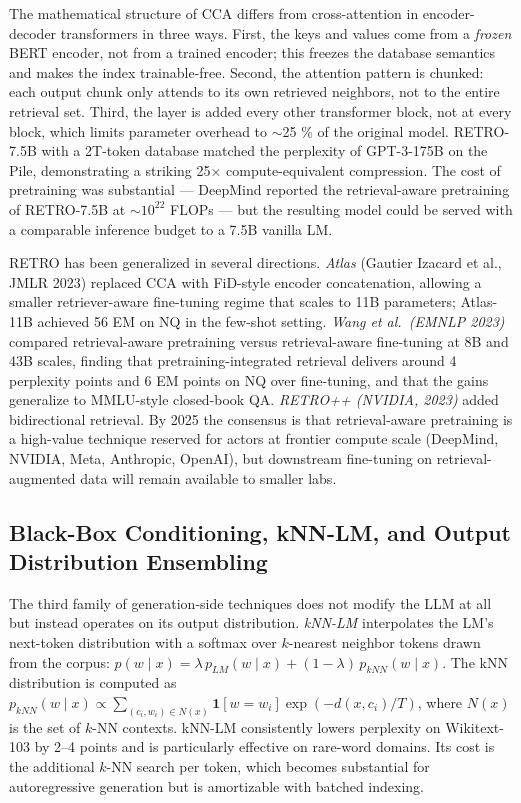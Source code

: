 \documentclass{article}
\begin{document}
The mathematical structure of CCA differs from cross-attention in encoder-decoder transformers in three ways. First, the keys and values come from a \emph{frozen} BERT encoder, not from a trained encoder; this freezes the database semantics and makes the index trainable-free. Second, the attention pattern is chunked: each output chunk only attends to its own retrieved neighbors, not to the entire retrieval set. Third, the layer is added every other transformer block, not at every block, which limits parameter overhead to $\sim$25 \% of the original model. RETRO-7.5B with a 2T-token database matched the perplexity of GPT-3-175B on the Pile, demonstrating a striking 25× compute-equivalent compression. The cost of pretraining was substantial --- DeepMind reported the retrieval-aware pretraining of RETRO-7.5B at \(\sim 10^{22}\) FLOPs --- but the resulting model could be served with a comparable inference budget to a 7.5B vanilla LM.

RETRO has been generalized in several directions. \emph{Atlas} (Gautier Izacard et al., JMLR 2023) replaced CCA with FiD-style encoder concatenation, allowing a smaller retriever-aware fine-tuning regime that scales to 11B parameters; Atlas-11B achieved 56 EM on NQ in the few-shot setting. \emph{Wang et al.~(EMNLP 2023)} compared retrieval-aware pretraining versus retrieval-aware fine-tuning at 8B and 43B scales, finding that pretraining-integrated retrieval delivers around 4 perplexity points and 6 EM points on NQ over fine-tuning, and that the gains generalize to MMLU-style closed-book QA. \emph{RETRO++ (NVIDIA, 2023)} added bidirectional retrieval. By 2025 the consensus is that retrieval-aware pretraining is a high-value technique reserved for actors at frontier compute scale (DeepMind, NVIDIA, Meta, Anthropic, OpenAI), but downstream fine-tuning on retrieval-augmented data will remain available to smaller labs.

\subsection{Black-Box Conditioning, kNN-LM, and Output Distribution Ensembling}\label{black-box-conditioning-knn-lm-and-output-distribution-ensembling}

The third family of generation-side techniques does not modify the LLM at all but instead operates on its output distribution. \emph{kNN-LM} \citep{khandelwal2020generalizationthro} interpolates the LM's next-token distribution with a softmax over \(k\)-nearest neighbor tokens drawn from the corpus: \(p(w \mid x) = \lambda \, p_{LM}(w \mid x) + (1 - \lambda) \, p_{kNN}(w \mid x)\). The kNN distribution is computed as \(p_{kNN}(w \mid x) \propto \sum_{(c_i, w_i) \in N(x)} \mathbf{1}[w = w_i] \exp(-d(x, c_i) / T)\), where \(N(x)\) is the set of \(k\)-NN contexts. kNN-LM consistently lowers perplexity on Wikitext-103 by 2--4 points and is particularly effective on rare-word domains. Its cost is the additional \(k\)-NN search per token, which becomes substantial for autoregressive generation but is amortizable with batched indexing.
\end{document}
